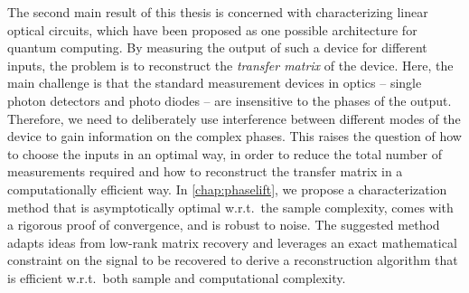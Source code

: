 The second main result of this thesis is concerned with characterizing linear optical circuits, which have been proposed as one possible architecture for quantum computing.
By measuring the output of such a device for different inputs, the problem is to reconstruct the \emph{transfer matrix} of the device.
Here, the main challenge is that the standard measurement devices in optics -- single photon detectors and photo diodes -- are insensitive to the phases of the output.
Therefore, we need to deliberately use interference between different modes of the device to gain information on the complex phases.
This raises the question of how to choose the inputs in an optimal way, in order to reduce the total number of measurements required and how to reconstruct the transfer matrix in a computationally efficient way.
In \cref{chap:phaselift}, we propose a characterization method that is asymptotically optimal w.r.t.\ the sample complexity, comes with a rigorous proof of convergence, and is robust to noise.
The suggested method adapts ideas from low-rank matrix recovery and leverages an exact mathematical constraint on the signal to be recovered to derive a reconstruction algorithm that is efficient w.r.t.\ both sample and computational complexity.

